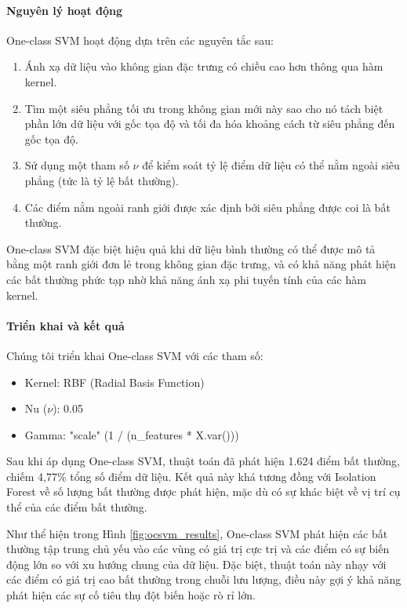 \paragraph{Nguyên lý hoạt động}
One-class SVM hoạt động dựa trên các nguyên tắc sau:
\begin{enumerate}
    \item Ánh xạ dữ liệu vào không gian đặc trưng có chiều cao hơn thông qua hàm kernel.
    \item Tìm một siêu phẳng tối ưu trong không gian mới này sao cho nó tách biệt phần lớn dữ liệu với gốc tọa độ và tối đa hóa khoảng cách từ siêu phẳng đến gốc tọa độ.
    \item Sử dụng một tham số $\nu$ để kiểm soát tỷ lệ điểm dữ liệu có thể nằm ngoài siêu phẳng (tức là tỷ lệ bất thường).
    \item Các điểm nằm ngoài ranh giới được xác định bởi siêu phẳng được coi là bất thường.
\end{enumerate}

One-class SVM đặc biệt hiệu quả khi dữ liệu bình thường có thể được mô tả bằng một ranh giới đơn lẻ trong không gian đặc trưng, và có khả năng phát hiện các bất thường phức tạp nhờ khả năng ánh xạ phi tuyến tính của các hàm kernel.

\paragraph{Triển khai và kết quả}
Chúng tôi triển khai One-class SVM với các tham số:
\begin{itemize}
    \item Kernel: RBF (Radial Basis Function)
    \item Nu ($\nu$): 0.05
    \item Gamma: "scale" (1 / (n\_features * X.var()))
\end{itemize}

Sau khi áp dụng One-class SVM, thuật toán đã phát hiện 1.624 điểm bất thường, chiếm 4,77\% tổng số điểm dữ liệu. Kết quả này khá tương đồng với Isolation Forest về số lượng bất thường được phát hiện, mặc dù có sự khác biệt về vị trí cụ thể của các điểm bất thường.

Như thể hiện trong Hình \ref{fig:ocsvm_results}, One-class SVM phát hiện các bất thường tập trung chủ yếu vào các vùng có giá trị cực trị và các điểm có sự biến động lớn so với xu hướng chung của dữ liệu. Đặc biệt, thuật toán này nhạy với các điểm có giá trị cao bất thường trong chuỗi lưu lượng, điều này gợi ý khả năng phát hiện các sự cố tiêu thụ đột biến hoặc rò rỉ lớn.

